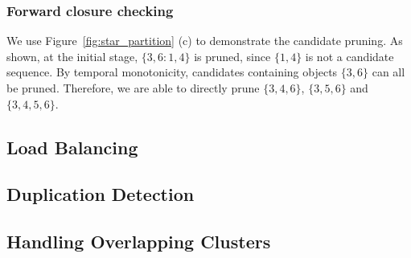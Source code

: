 \subsubsection{Forward closure checking}

\begin{example}
We use Figure~\ref{fig:star_partition} (c) to demonstrate the candidate pruning. As shown, at the initial stage, $\{3,6:1,4\}$ is pruned, since $\{1,4\}$ is not a candidate sequence. By temporal monotonicity, candidates containing objects $\{3,6\}$ can all be pruned. Therefore, we are able to directly prune $\{3,4,6\}$, $\{3,5,6\}$ and $\{3,4,5,6\}$.
\end{example}
%
\subsection{Load Balancing}

\subsection{Duplication Detection}

\subsection{Handling Overlapping Clusters}